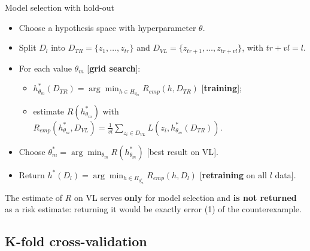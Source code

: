 \begin{boxabstract}{Model selection with hold-out}

\begin{itemize}
\tightlist
\item
  Choose a hypothesis space with hyperparameter \(\theta\).
\item
  Split \(D_l\) into \(D_{TR} = \{z_1, \dots, z_{tr}\}\) and
  \(D_{VL} = \{z_{tr+1}, \dots, z_{tr+vl}\}\), with \(tr + vl = l\).
\item
  For each value \(\theta_m\) {[}\textbf{grid search}{]}:

  \begin{itemize}
  \tightlist
  \item
    \(h^*_{\theta_m}(D_{TR}) = \arg\min_{h \in H_{\theta_m}} R_{emp}(h, D_{TR})\)
    {[}\textbf{training}{]};
  \item
    estimate \(R(h^*_{\theta_m})\) with
    \(R_{emp}(h^*_{\theta_m}, D_{VL}) = \frac{1}{vl}\sum_{z_i \in D_{VL}} L(z_i, h^*_{\theta_m}(D_{TR}))\).
  \end{itemize}
\item
  Choose \(\theta^*_m = \arg\min_{\theta_m} R(h^*_{\theta_m})\)
  {[}best result on VL{]}.
\item
  Return
  \(h^*(D_l) = \arg\min_{h \in H_{\theta^*_m}} R_{emp}(h, D_l)\)
  {[}\textbf{retraining} on all \(l\) data{]}.
\end{itemize}

\end{boxabstract}

The estimate of \(R\) on VL serves \textbf{only} for model selection
and \textbf{is not returned} as a risk estimate: returning it would be
exactly error (1) of the counterexample.

\subsection{K-fold cross-validation}\label{k-fold-cross-validation}

